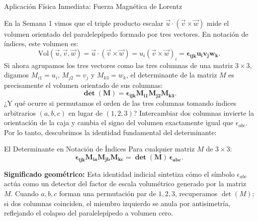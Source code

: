 \documentclass[11pt,letterpaper]{article}
\begin{document}
\begin{examplebox}{Aplicación Física Inmediata: Fuerza Magnética de Lorentz}
\begin{center}
\end{center}
\end{examplebox}

En la Semana 1 vimos que el triple producto escalar $\vec{u}\cdot(\vec{v}\times\vec{w})$ mide el volumen orientado del paralelepípedo formado por tres vectores. En notación de índices, este volumen es:
\[
\text{Vol}(\vec{u}, \vec{v}, \vec{w}) = \vec{u}\cdot(\vec{v}\times\vec{w}) = u_i (\vec{v}\times\vec{w})_i = \mathbf{\epsilon_{ijk} u_i v_j w_k}.
\]
Si ahora agrupamos los tres vectores como las tres columnas de una matriz $3 \times 3$, digamos $M_{i1} = u_i$, $M_{j2} = v_j$ y $M_{k3} = w_k$, el determinante de la matriz $M$ es precisamente el volumen orientado de sus columnas:
\[
\mathbf{\det(M) = \epsilon_{ijk} M_{i1} M_{j2} M_{k3}}.
\]
¿Y qué ocurre si permutamos el orden de las tres columnas tomando índices arbitrarios $(a, b, c)$ en lugar de $(1, 2, 3)$? Intercambiar dos columnas invierte la orientación de la caja y cambia el signo del volumen exactamente igual que $\epsilon_{abc}$. Por lo tanto, descubrimos la identidad fundamental del determinante:
\begin{theorembox}{El Determinante en Notación de Índices}
Para cualquier matriz $M$ de $3 \times 3$:
\[
\mathbf{\epsilon_{ijk} M_{ia} M_{jb} M_{kc} = \det(M)\,\epsilon_{abc}}.
\]
\end{theorembox}
\textbf{Significado geométrico:} Esta identidad indicial sintetiza cómo el símbolo $\epsilon_{abc}$ actúa como un detector del factor de escala volumétrico generado por la matriz $M$. Cuando $a, b, c$ forman una permutación par de $1, 2, 3$, recuperamos $\det(M)$; si dos columnas coinciden, el miembro izquierdo se anula por antisimetría, reflejando el colapso del paralelepípedo a volumen cero.
\end{document}

